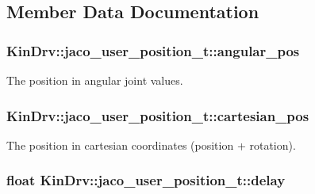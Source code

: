 \subsection{Member Data Documentation}
\hypertarget{structKinDrv_1_1jaco__user__position__t_af70be18891d0d8a4ff5dd4c83ea4e5ae}{
\subsubsection[{angular\+\_\+pos}]{ Kin\+Drv\+::jaco\+\_\+user\+\_\+position\+\_\+t\+::angular\+\_\+pos}}\label{structKinDrv_1_1jaco__user__position__t_af70be18891d0d8a4ff5dd4c83ea4e5ae}
The position in angular joint values. \hypertarget{structKinDrv_1_1jaco__user__position__t_a40ad642f7934033ee89b4666434e471f}{
\subsubsection[{cartesian\+\_\+pos}]{ Kin\+Drv\+::jaco\+\_\+user\+\_\+position\+\_\+t\+::cartesian\+\_\+pos}}\label{structKinDrv_1_1jaco__user__position__t_a40ad642f7934033ee89b4666434e471f}
The position in cartesian coordinates (position + rotation). \hypertarget{structKinDrv_1_1jaco__user__position__t_abfe11bcd4ead7fadfe5f4592c67650ef}{
\subsubsection[{delay}]{\setlength{\rightskip}{0pt plus 5cm}float Kin\+Drv\+::jaco\+\_\+user\+\_\+position\+\_\+t\+::delay}}\label{structKinDrv_1_1jaco__user__position__t_abfe11bcd4ead7fadfe5f4592c67650ef}
